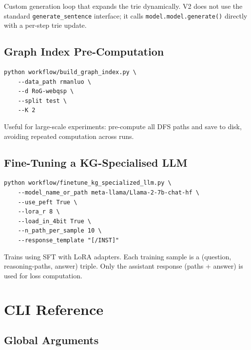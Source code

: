 \documentclass[11pt,a4paper,oneside,openany]{book}
\theoremstyle{definition}
\newcommand{\code}[1]{\texttt{#1}}
\begin{document}
Custom generation loop that expands the trie dynamically. V2 does not use the standard \code{generate\_sentence} interface; it calls \code{model.model.generate()} directly with a per-step trie update.

\section{Graph Index Pre-Computation}

\begin{lstlisting}[numbers=none,frame=none]
python workflow/build_graph_index.py \
    --data_path rmanluo \
    --d RoG-webqsp \
    --split test \
    --K 2
\end{lstlisting}

Useful for large-scale experiments: pre-compute all DFS paths and save to disk, avoiding repeated computation across runs.

\section{Fine-Tuning a KG-Specialised LLM}

\begin{lstlisting}[numbers=none,frame=none]
python workflow/finetune_kg_specialized_llm.py \
    --model_name_or_path meta-llama/Llama-2-7b-chat-hf \
    --use_peft True \
    --lora_r 8 \
    --load_in_4bit True \
    --n_path_per_sample 10 \
    --response_template "[/INST]"
\end{lstlisting}

Trains using SFT with LoRA adapters. Each training sample is a (question, reasoning-paths, answer) triple. Only the assistant response (paths + answer) is used for loss computation.

\chapter{CLI Reference}\label{ch:cli}

\section{Global Arguments}
\end{document}
